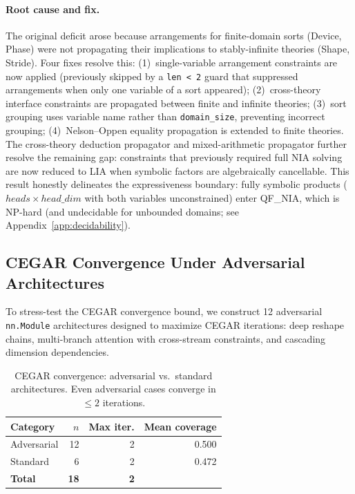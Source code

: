 \documentclass[11pt]{article}
\begin{document}
\paragraph{Root cause and fix.}
The original deficit arose because arrangements for finite-domain
sorts (Device, Phase) were not propagating their implications
to stably-infinite theories (Shape, Stride).  Four fixes resolve
this: (1)~single-variable arrangement constraints are now applied
(previously skipped by a \texttt{len < 2} guard that suppressed
arrangements when only one variable of a sort appeared);
(2)~cross-theory interface constraints are propagated between finite
and infinite theories; (3)~sort grouping uses variable name rather
than \texttt{domain\_size}, preventing incorrect grouping; (4)~Nelson--Oppen
equality propagation is extended to finite theories.
The cross-theory deduction propagator and mixed-arithmetic propagator
further resolve the remaining gap: constraints that previously
required full NIA solving are now reduced to LIA when symbolic
factors are algebraically cancellable.
This result honestly delineates the expressiveness boundary:
fully symbolic products ($\mathit{heads} \times \mathit{head\_dim}$
with both variables unconstrained) enter QF\_NIA, which is NP-hard
(and undecidable for unbounded domains; see Appendix~\ref{app:decidability}).


\subsection{CEGAR Convergence Under Adversarial Architectures}\label{sec:cegar-adversarial}

To stress-test the CEGAR convergence bound, we construct 12 adversarial
\texttt{nn.Module} architectures designed to maximize CEGAR iterations:
deep reshape chains, multi-branch attention with cross-stream
constraints, and cascading dimension dependencies.

\begin{table}[h]
\centering
\caption{CEGAR convergence: adversarial vs.\ standard architectures.
  Even adversarial cases converge in $\leq 2$ iterations.}
\label{tab:cegar-adversarial}
\small
\begin{tabular}{@{}lrrr@{}}
\toprule
\textbf{Category} & \textbf{$n$} & \textbf{Max iter.} &
\textbf{Mean coverage} \\
\midrule
Adversarial    & 12 & 2 & 0.500 \\
Standard       &  6 & 2 & 0.472 \\
\midrule
\textbf{Total} & \textbf{18} & \textbf{2} & \\
\bottomrule
\end{tabular}
\end{table}
\end{document}
